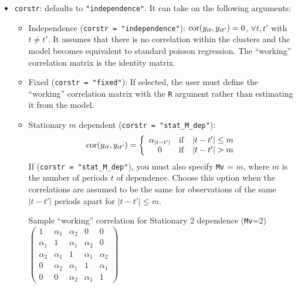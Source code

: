 \begin{itemize}
\item \texttt{corstr}: defaults to {\tt "independence"}.  It can take on the following arguments:
\begin{itemize}
\item Independence (\texttt{corstr = "independence"}): ${\rm
    cor}(y_{it}, y_{it'})=0$, $\forall t, t'$ with $t\ne t'$.  It assumes that there is no correlation within the clusters and the model becomes equivalent to standard poisson regression.  The ``working'' correlation matrix is the identity matrix.
\item Fixed (\texttt{corstr = "fixed"}): If selected, the user must define the ``working'' correlation matrix with the \texttt{R} argument rather than estimating it from the model.
\item Stationary $m$ dependent (\texttt{corstr = "stat\_M\_dep"}):
  $${\rm cor}(y_{it}, y_{it'})=\left\{\begin{array}{ccc}
      \alpha_{|t-t'|} & {\rm if} & |t-t'|\le m \\ 0 & {\rm if}
      & |t-t'| > m
    \end{array}\right.$$
  If (\texttt{corstr = "stat\_M\_dep"}), you must also specify \texttt{Mv} = $m$, where $m$
is the number of periods $t$ of dependence.  Choose this option when the correlations are assumed to be the same for observations of the same $|t-t'|$ periods apart for $|t-t'| \leq m$.
\begin{center}
Sample ``working'' correlation for Stationary 2 dependence ({\tt Mv}=2)\\
\bigskip
$\left( \begin{array}{ccccc}
1 & \alpha_1 & \alpha_2 & 0 & 0 \\
\alpha_1 & 1 & \alpha_1 & \alpha_2 & 0 \\
\alpha_2 & \alpha_1 & 1 & \alpha_1 & \alpha_2 \\
0 & \alpha_2 & \alpha_1 & 1 & \alpha_1 \\
0 & 0 & \alpha_2 & \alpha_1 & 1
\end{array} \right) $
\end{center}


\end{itemize}
\end{itemize}

